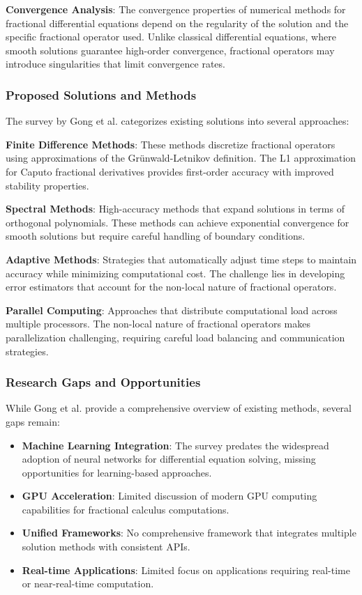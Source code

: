 \textbf{Convergence Analysis}: The convergence properties of numerical methods for fractional differential equations depend on the regularity of the solution and the specific fractional operator used. Unlike classical differential equations, where smooth solutions guarantee high-order convergence, fractional operators may introduce singularities that limit convergence rates.

\subsubsection{Proposed Solutions and Methods}

The survey by Gong et al. categorizes existing solutions into several approaches:

\textbf{Finite Difference Methods}: These methods discretize fractional operators using approximations of the Grünwald-Letnikov definition. The L1 approximation for Caputo fractional derivatives provides first-order accuracy with improved stability properties.

\textbf{Spectral Methods}: High-accuracy methods that expand solutions in terms of orthogonal polynomials. These methods can achieve exponential convergence for smooth solutions but require careful handling of boundary conditions.

\textbf{Adaptive Methods}: Strategies that automatically adjust time steps to maintain accuracy while minimizing computational cost. The challenge lies in developing error estimators that account for the non-local nature of fractional operators.

\textbf{Parallel Computing}: Approaches that distribute computational load across multiple processors. The non-local nature of fractional operators makes parallelization challenging, requiring careful load balancing and communication strategies.

\subsubsection{Research Gaps and Opportunities}

While Gong et al. provide a comprehensive overview of existing methods, several gaps remain:

\begin{itemize}
    \item \textbf{Machine Learning Integration}: The survey predates the widespread adoption of neural networks for differential equation solving, missing opportunities for learning-based approaches.
    \item \textbf{GPU Acceleration}: Limited discussion of modern GPU computing capabilities for fractional calculus computations.
    \item \textbf{Unified Frameworks}: No comprehensive framework that integrates multiple solution methods with consistent APIs.
    \item \textbf{Real-time Applications}: Limited focus on applications requiring real-time or near-real-time computation.
\end{itemize}

